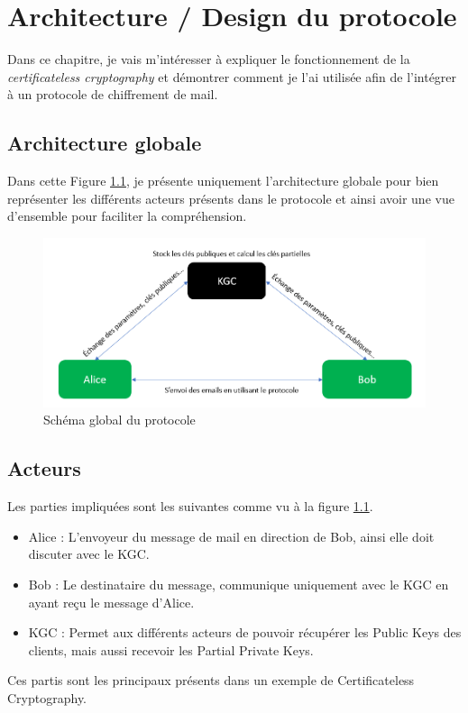 \chapter{Architecture / Design du protocole}
\label{ch:arch}
Dans ce chapitre, je vais m'intéresser à expliquer le fonctionnement de la \textit{certificateless cryptography} et démontrer comment je l'ai utilisée afin de l'intégrer à un protocole de chiffrement de mail.
\section{Architecture globale}
Dans cette Figure \ref{fig:globalProtocol}, je présente uniquement l'architecture globale pour bien représenter les différents acteurs présents dans le protocole et ainsi avoir une vue d'ensemble pour faciliter la compréhension.
\begin{figure}[h!]
	\centering
	\includegraphics[width=14cm]{images/SchemaGlobal.png}
	\caption{Schéma global du protocole}
	\label{fig:globalProtocol}
\end{figure}
\section{Acteurs}
Les parties impliquées sont les suivantes comme vu à la figure \ref{fig:globalProtocol}.
\begin{itemize}
	\item Alice : L'envoyeur du message de mail en direction de Bob, ainsi elle doit discuter avec le KGC.
	\item Bob : Le destinataire du message, communique uniquement avec le KGC en ayant reçu le message d'Alice.
	\item KGC : Permet aux différents acteurs de pouvoir récupérer les Public Keys des clients, mais aussi recevoir les Partial Private Keys. 
\end{itemize}
Ces partis sont les principaux présents dans un exemple de Certificateless Cryptography.
